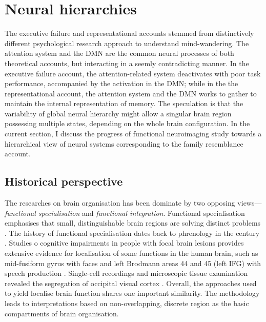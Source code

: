 \section{Neural hierarchies}
\label{ch:intro:neural}

The executive failure and representational accounts stemmed from distinctively different psychological research approach to understand mind-wandering. The attention system and the DMN are the common neural processes of both theoretical accounts, but interacting in a seemly contradicting manner. In the executive failure account, the attention-related system deactivates with poor task performance, accompanied by the activation in the DMN; while in the the representational account, the attention system and the DMN works to gather to maintain the internal representation of memory. The speculation is that the variability of global neural hierarchy might allow a singular brain region possessing multiple states, depending on the whole brain configuration. In the current section, I discuss the progress of functional neuroimaging study towards a hierarchical view of neural systems corresponding to the family resemblance account.

\subsection{Historical perspective}

The researches on brain organisation has been dominate by two opposing views---\textit{functional specialisation} and \textit{functional integration}. Functional specialisation emphasises that small, distinguishable brain regions are solving distinct problems \cite{Kanwisher2010}. The history of functional specialisation dates back to phrenology in the  century \cite<for more history about functional localisation, see supporting information in>{Kanwisher2010}. Studies o cognitive impairments in people with focal brain lesions provides extensive evidence for localisation of some functions in the human brain, such as mid-fusiform gyrus with faces \cite{Iaria2008} and left Brodmann areas 44 and 45 (left IFG) with speech production \cite{Broca1861}. Single-cell recordings and microscopic tissue examination revealed the segregation of occipital visual cortex \cite{Zeki1978}. Overall, the approaches used to yield localise brain function shares one important similarity. The methodology leads to interpretations based on non-overlapping, discrete region as the basic compartments of brain organisation. 

